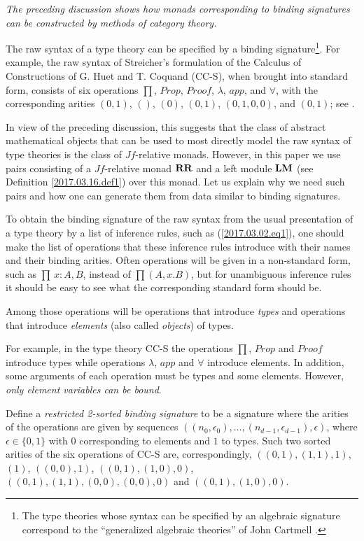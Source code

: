 \documentclass[12pt]{amsart}
\numberwithin{proposition}{subsection}
\newcommand{\RR}{{\bf RR}}
\newcommand{\LM}{{\bf LM}}
\begin{document}
{\em The preceding discussion shows how monads corresponding to binding
  signatures can be constructed by methods of category theory.}

The raw syntax of a type theory can be specified by a binding
signature\footnote{The type theories whose syntax can be specified by an
  algebraic signature correspond to the ``generalized algebraic theories'' of
  John Cartmell \cite{Cartmell1,Cartmell0,Garner}.}.  For
example, the raw syntax of Streicher's formulation of the Calculus of
Constructions of G. Huet and T. Coquand (CC-S), when brought into standard
form, consists of six operations $\prod$, $Prop$, $Proof$, $\lambda$, $app$, and
$\forall$, with the corresponding arities $(0,1)$, $()$, $(0)$, $(0,1)$,
$(0,1,0,0)$, and $(0,1)$; see \cite[p.~157]{Streicher}.

In view of the preceding discussion, this suggests that the class of abstract
mathematical objects that can be used to most directly model the raw syntax of
type theories is the class of $Jf$-relative monads. However, in this paper we
use pairs consisting of a $Jf$-relative monad $\RR$ and a left module $\LM$ (see
Definition \ref{2017.03.16.def1}) over this monad. Let us explain why we need
such pairs and how one can generate them from data similar to binding
signatures.

To obtain the binding signature of the raw syntax from the usual presentation
of a type theory by a list of inference rules, such as (\ref{2017.03.02.eq1}),
one should make the list of operations that these inference rules introduce
with their names and their binding arities. Often operations will be given in a
non-standard form, such as $\prod\,x:A,B$, instead of $\prod(A,x.B)$, but for
unambiguous inference rules it should be easy to see what the corresponding
standard form should be.

Among those operations will be operations that introduce {\em types} and
operations that introduce {\em elements} (also called {\em objects}) of types.

For example, in the type theory CC-S the operations $\prod$, $Prop$ and $Proof$
introduce types while operations $\lambda$, $app$ and $\forall$ introduce
elements.  In addition, some arguments of each operation must be types and some
elements. However, {\em only element variables can be bound}.

Define a {\em restricted 2-sorted binding signature} to be a signature where the arities of the
operations are given by sequences
$((n_0,\epsilon_0),\dots,(n_{d-1},\epsilon_{d-1}),\epsilon)$, where
$\epsilon\in\{0,1\}$ with $0$ corresponding to elements and $1$ to types. Such
two sorted arities of the six operations of CC-S are, correspondingly,
$((0,1),(1,1),1)$, $(1)$, $((0,0),1)$, $((0,1),(1,0),0)$,
$((0,1),(1,1),(0,0),(0,0),0)$ and $((0,1),(1,0),0)$.
\end{document}
